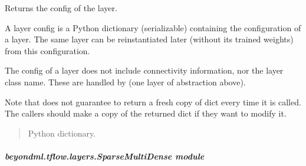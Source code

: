 \documentclass[letterpaper,10pt,english]{sphinxmanual}
\begin{document}
\begin{fulllineitems}
\begin{fulllineitems}
\end{fulllineitems}


\begin{fulllineitems}
\label{\detokenize{beyondml.tflow.layers:beyondml.tflow.layers.SparseMultiConv3D.SparseMultiConv3D.get_config}}
\pysigstartsignatures
{}
\pysigstopsignatures
\sphinxAtStartPar
Returns the config of the layer.

\sphinxAtStartPar
A layer config is a Python dictionary (serializable)
containing the configuration of a layer.
The same layer can be reinstantiated later
(without its trained weights) from this configuration.

\sphinxAtStartPar
The config of a layer does not include connectivity
information, nor the layer class name. These are handled
by  (one layer of abstraction above).

\sphinxAtStartPar
Note that  does not guarantee to return a fresh copy of
dict every time it is called. The callers should make a copy of the
returned dict if they want to modify it.
\begin{quote}\begin{description}
\sphinxAtStartPar
Python dictionary.

\end{description}\end{quote}

\end{fulllineitems}


\end{fulllineitems}



\subparagraph{beyondml.tflow.layers.SparseMultiDense module}
\label{\detokenize{beyondml.tflow.layers:module-beyondml.tflow.layers.SparseMultiDense}}\label{\detokenize{beyondml.tflow.layers:beyondml-tflow-layers-sparsemultidense-module}}
\end{document}
